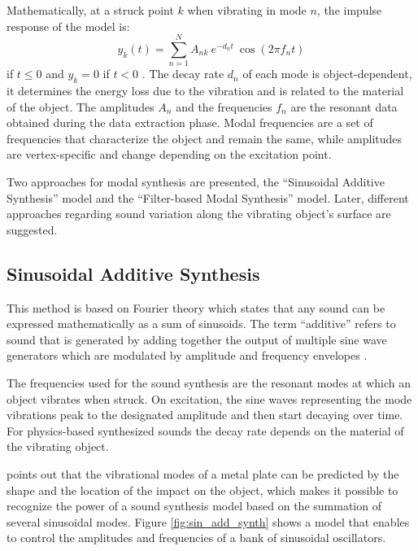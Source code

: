 Mathematically, at a struck point $k$ when vibrating in mode $n$, the impulse response of the model is:
\begin{equation}\label{eq:modal_response}
y_k(t) = \sum\limits_{n=1}^{N} A_{nk}\ e^{-d_n t}\ \cos(2 \pi f_nt)
\end{equation}
if $t\leqslant 0$ and $y_k = 0$ if $t<0$ \cite{van2001foleyautomatic}. The decay rate $d_n$ of each mode is object-dependent, it determines the energy loss due to the vibration and is related to the material of the object. The amplitudes $A_n$ and the frequencies $f_n$ are the resonant data obtained during the data extraction phase. Modal frequencies are a set of frequencies that characterize the object and remain the same, while amplitudes are vertex-specific and change depending on the excitation point.

Two approaches for modal synthesis are presented, the ``Sinusoidal Additive Synthesis'' model and the ``Filter-based Modal Synthesis'' model. Later, different approaches regarding sound variation along the vibrating object's surface are suggested.

\subsection{Sinusoidal Additive Synthesis}\label{sec:sin_synth}

This method is based on Fourier theory which states that any sound can be expressed mathematically as a sum of sinusoids. The term ``additive'' refers to sound that is generated by adding together the output of multiple sine wave generators which are modulated by amplitude and frequency envelopes \cite{smith2011spectral}.

The frequencies used for the sound synthesis are the resonant modes at which an object vibrates when struck. On excitation, the sine waves representing the mode vibrations peak to the designated amplitude and then start decaying over time. For physics-based synthesized sounds the decay rate depends on the material of the vibrating object.%

\cite{Cook:2002:RSS:515316} points out that the vibrational modes of a  metal plate can be predicted by the shape and the location of the impact on the object, which makes it possible to recognize the power of a sound synthesis model based on the summation of several sinusoidal modes. Figure \ref{fig:sin_add_synth} shows a model that enables to control the amplitudes and frequencies of a bank of sinusoidal oscillators.

